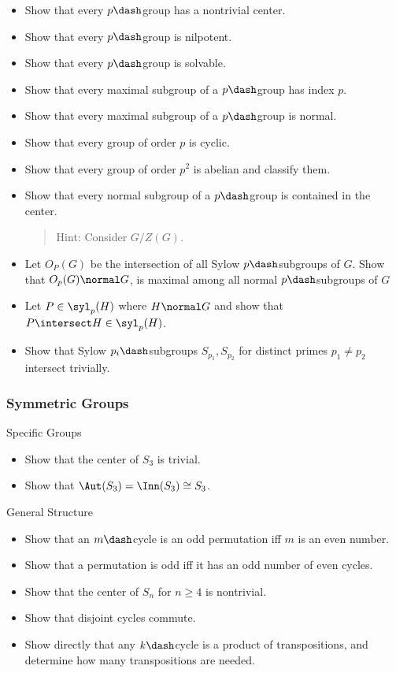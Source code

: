 \begin{itemize}
\item
  Show that every \(p\dash\)group has a nontrivial center.
\item
  Show that every \(p\dash\)group is nilpotent.
\item
  Show that every \(p\dash\)group is solvable.
\item
  Show that every maximal subgroup of a \(p\dash\)group has index \(p\).
\item
  Show that every maximal subgroup of a \(p\dash\)group is normal.
\item
  Show that every group of order \(p\) is cyclic.
\item
  Show that every group of order \(p^2\) is abelian and classify them.
\item
  Show that every normal subgroup of a \(p\dash\)group is contained in
  the center.

  \begin{quote}
  Hint: Consider \(G/Z(G)\).
  \end{quote}
\item
  Let \(O_P(G)\) be the intersection of all Sylow \(p\dash\)subgroups of
  \(G\). Show that \(O_p(G) \normal G\), is maximal among all normal
  \(p\dash\)subgroups of \(G\)
\item
  Let \(P\in \syl_p(H)\) where \(H\normal G\) and show that
  \(P\intersect H \in \syl_p(H)\).
\item
  Show that Sylow \(p_i\dash\)subgroups \(S_{p_1}, S_{p_2}\) for
  distinct primes \(p_1\neq p_2\) intersect trivially.
\end{itemize}

\hypertarget{symmetric-groups}{%
\subsubsection{Symmetric Groups}\label{symmetric-groups}}

Specific Groups

\begin{itemize}
\tightlist
\item
  Show that the center of \(S_3\) is trivial.
\item
  Show that \(\Aut(S_3) = \Inn(S_3) \cong S_3\).
\end{itemize}

General Structure

\begin{itemize}
\tightlist
\item
  Show that an \(m\dash\)cycle is an odd permutation iff \(m\) is an
  even number.
\item
  Show that a permutation is odd iff it has an odd number of even
  cycles.
\item
  Show that the center of \(S_n\) for \(n\geq 4\) is nontrivial.
\item
  Show that disjoint cycles commute.
\item
  Show directly that any \(k\dash\)cycle is a product of transpositions,
  and determine how many transpositions are needed.
\end{itemize}

